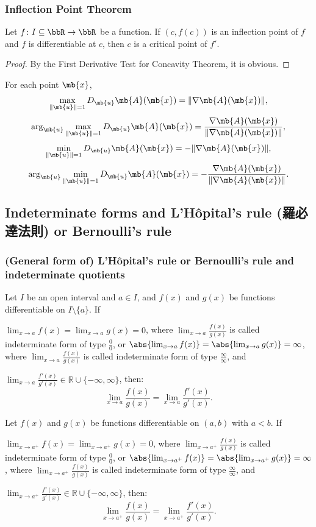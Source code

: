 \subsubsection{Inflection Point Theorem}
Let $f\colon I\subseteq\bbR\to\bbR$ be a function. If $(c,f(c))$ is an inflection point of $f$ and $f$ is differentiable at $c$, then $c$ is a critical point of $f'$.
\begin{proof}
By the First Derivative Test for Concavity Theorem, it is obvious.
\end{proof}
For each point $\mb{x}$,
\[\max_{\|\mb{u}\|=1}D_{\mb{u}}\mb{A}(\mb{x})=\|\nabla\mb{A}(\mb{x})\|,\]
\[\arg_{\mb{u}}\max_{\|\mb{u}\|=1}D_{\mb{u}}\mb{A}(\mb{x})=\frac{\nabla\mb{A}(\mb{x})}{\|\nabla\mb{A}(\mb{x})\|},\]
\[\min_{\|\mb{u}\|=1}D_{\mb{u}}\mb{A}(\mb{x})=-\|\nabla\mb{A}(\mb{x})\|,\]
\[\arg_{\mb{u}}\min_{\|\mb{u}\|=1}D_{\mb{u}}\mb{A}(\mb{x})=-\frac{\nabla\mb{A}(\mb{x})}{\|\nabla\mb{A}(\mb{x})\|}.\]
\subsection{Indeterminate forms and L'Hôpital's rule (羅必達法則) or Bernoulli's rule}
\subsubsection{(General form of) L'Hôpital's rule or Bernoulli's rule and indeterminate quotients}
Let $I$ be an open interval and $a\in I$, and $f(x)$ and $g(x)$ be functions differentiable on $I\setminus\{a\}$. If
\bit
\item $\lim_{x\to a}f(x)=\lim_{x\to a}g(x)=0$, where $\lim_{x\to a}\frac{f(x)}{g(x)}$ is called indeterminate form of type $\frac{0}{0}$, or $\abs{\lim_{x\to a}f(x)}=\abs{\lim_{x\to a}g(x)}=\infty$, where $\lim_{x\to a}\frac{f(x)}{g(x)}$ is called indeterminate form of type $\frac{\infty}{\infty}$, and
\item $\lim_{x\to a}\frac{f'(x)}{g'(x)}\in\mathbb{R}\cup\{-\infty,\infty\}$,
\eit
then:
\[\lim_{x\to a}\frac{f(x)}{g(x)}=\lim_{x\to a}\frac{f'(x)}{g'(x)}.\]

Let $f(x)$ and $g(x)$ be functions differentiable on $(a,b)$ with $a<b$. If
\bit
\item $\lim_{x\to a^+}f(x)=\lim_{x\to a^+}g(x)=0$, where $\lim_{x\to a^+}\frac{f(x)}{g(x)}$ is called indeterminate form of type $\frac{0}{0}$, or $\abs{\lim_{x\to a^+}f(x)}=\abs{\lim_{x\to a^+}g(x)}=\infty$, where $\lim_{x\to a^+}\frac{f(x)}{g(x)}$ is called indeterminate form of type $\frac{\infty}{\infty}$, and
\item $\lim_{x\to a^+}\frac{f'(x)}{g'(x)}\in\mathbb{R}\cup\{-\infty,\infty\}$,
\eit
then:
\[\lim_{x\to a^+}\frac{f(x)}{g(x)}=\lim_{x\to a^+}\frac{f'(x)}{g'(x)}.\]

